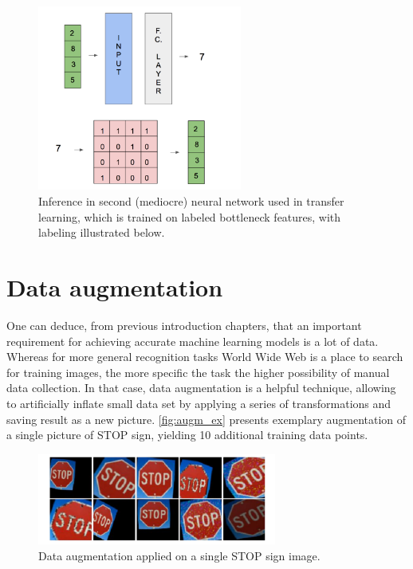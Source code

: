 \documentclass[11pt]{article}
\begin{document}
\begin{figure}[h]
\includegraphics[width=0.6\textwidth]{using_bottleneck}
\centering
\caption{Inference in second (mediocre) neural network used in transfer learning, which is trained on labeled bottleneck features, with labeling illustrated below.}
\label{fig:using_bottleneck}
\end{figure}
\clearpage

\section{Data augmentation} \label{data_augmentation}
One can deduce, from previous introduction chapters, that an important requirement for achieving accurate machine learning models is a lot of data. Whereas for more general recognition tasks World Wide Web is a place to search for training images, the more specific the task the higher possibility of manual data collection. In that case, data augmentation is a helpful technique, allowing to artificially inflate small data set by applying a series of transformations and saving result as a new picture. \autoref{fig:augm_ex} presents exemplary augmentation of a single picture of STOP sign, yielding 10 additional training data points.

\begin{figure}[h]
\includegraphics[width=0.7\textwidth]{augm_ex}
\centering
\caption{Data augmentation applied on a single STOP sign image.}
\label{fig:augm_ex}
\end{figure}
\end{document}
